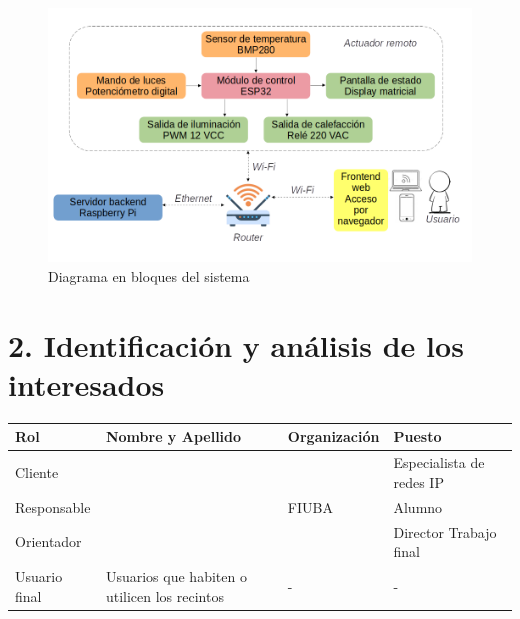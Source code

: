 \documentclass[
11pt, %
]{charter}
\begin{document}
\begin{figure}[htpb]
\centering 
\includegraphics[width=1\textwidth]{./Figuras/Diagrama-bloques.png}
\caption{Diagrama en bloques del sistema}
\label{fig:diagBloques}
\end{figure}

\vspace{25px}

\section{2. Identificación y análisis de los interesados}
\label{sec:interesados}

\begin{table}[ht]
\begin{tabularx}{\linewidth}{@{}|l|X|X|l|@{}}
\hline
\rowcolor[HTML]{C0C0C0} 
Rol				& Nombre y Apellido	& Organización		& Puesto 	\\ \hline
Cliente			& \clientename		&\empclientename		& Especialista de redes IP 	\\ \hline
Responsable		& \authorname		& FIUBA				& Alumno 	\\ \hline
Orientador		& \supname			& \pertesupname		& Director Trabajo final \\ \hline
Usuario final	& Usuarios que habiten o utilicen los recintos	& -		& -       	\\ \hline
\end{tabularx}
\end{table}
\end{document}
